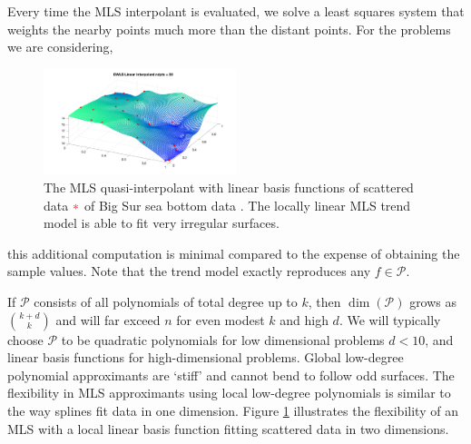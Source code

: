 \documentclass[11pt]{NSFamsart}
\newcommand{\calp}{{\mathcal{P}}}
\begin{document}
Every time the MLS interpolant is evaluated, we solve a least squares system that weights the nearby points much more than the distant points. For the problems we are considering,
\begin{figure}
\begin{center}
\includegraphics[width = 0.5\textwidth]{ProgramsImages/bigsurT.pdf}
\end{center}
\caption{The MLS quasi-interpolant with linear basis functions of scattered data {$\color{red}*$} of Big Sur sea bottom data \cite{franke1979critical}. The locally linear MLS trend model is able to fit very irregular surfaces.
\label{MLS}}
\end{figure}
this additional computation is minimal compared to the expense of obtaining the sample values. Note that the trend model exactly reproduces any $f \in \calp$.

If $\calp$ consists of all polynomials of total degree up to $k$, then $\dim(\calp)$ grows as ${k + d \choose k}$ and will far exceed $n$ for even modest $k$ and high $d$. 
We will typically choose $\calp$ to be quadratic polynomials for low dimensional problems $d<10$, and linear basis functions for high-dimensional problems. 
Global low-degree polynomial approximants are `stiff' and cannot bend to follow odd surfaces. The flexibility in MLS approximants using local low-degree polynomials is similar to the way splines fit data in one dimension. 
Figure \ref{MLS} illustrates the flexibility of an MLS with a local linear basis function fitting scattered data in two dimensions. 


\end{document}

